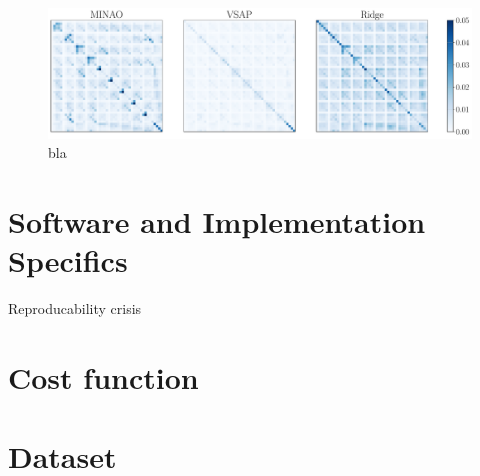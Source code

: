 \begin{figure}[H]
    \centering
    \includegraphics[width=\textwidth]{../fig/c5h4n2o2/density_error_comparison.pdf}
    \caption[]{bla}
    \label{fig:density_error_comparison}
\end{figure}

\section{Software and Implementation Specifics}
\label{sec:software_and_implementation}
Reproducability crisis
\section{Cost function}
\section{Dataset}